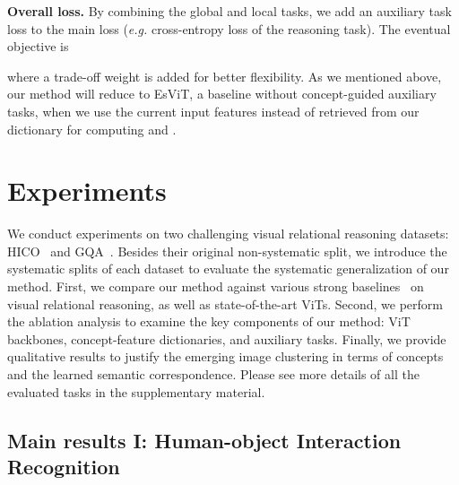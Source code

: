 \documentclass{article} \usepackage{iclr2022_conference,times}
\renewcommand{\paragraph}[1]{\noindent\textbf{#1.}}
\begin{document}
\paragraph{Overall loss}
By combining the global and local tasks, we add an auxiliary task loss  to the main loss  (\emph{e.g.} cross-entropy loss of the reasoning task). The eventual objective is
\vskip -0.25in

\vskip -0.1in
where a trade-off weight  is added for better flexibility. As we mentioned above, our method will reduce to EsViT, a baseline without concept-guided auxiliary tasks, when we use the current input features  instead of  retrieved from our dictionary for computing  and . 


\vspace{-0.1in}
\section{Experiments}
\label{sec:exp}
\vspace{-0.1in}




We conduct experiments on two challenging visual relational reasoning datasets: HICO~\citep{hico} and GQA~\citep{gqa}. Besides their original non-systematic split, we introduce the systematic splits of each dataset to evaluate the systematic generalization of our method. 
First, we compare our method against various strong baselines~\citep{mallya2016learning,girdhar2017attentional,hudson2018compositional} on visual relational reasoning, as well as state-of-the-art ViTs. 
Second, we perform the ablation analysis to examine the key components of our method: ViT backbones, concept-feature dictionaries, and auxiliary tasks.
Finally, we provide qualitative results to justify the emerging image clustering in terms of concepts and the learned semantic correspondence.
Please see more details of all the evaluated tasks in the supplementary material.


\vspace{-0.1in}
\subsection{Main results I: Human-object Interaction Recognition}
\label{sec:exp_hoi}
\vspace{-0.05in}
\end{document}
